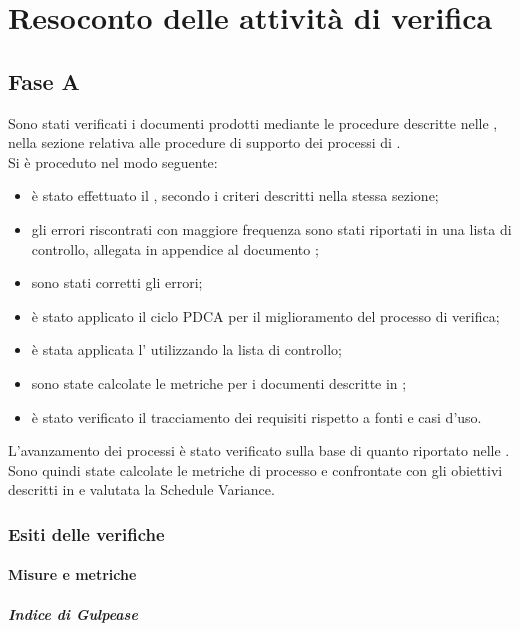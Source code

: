 \section{Resoconto delle attività di verifica}\label{app:resoconto_verifica}
\subsection{Fase A}
Sono stati verificati i documenti prodotti mediante le procedure descritte nelle \NormeDiProgetto{}, nella sezione relativa alle procedure di supporto dei processi di \VV{}.\\
Si è proceduto nel modo seguente:\begin{itemize}
	\item è stato effettuato il , secondo i criteri descritti nella stessa sezione;
	\item gli errori riscontrati con maggiore frequenza sono stati riportati in una lista di controllo, allegata in appendice al documento \NormeDiProgetto{};
	\item sono stati corretti gli errori;
	\item è stato applicato il ciclo PDCA per il miglioramento del processo di verifica;
	\item è stata applicata l' utilizzando la lista di controllo;
	\item sono state calcolate le metriche per i documenti descritte in \NormeDiProgetto{};
	\item è stato verificato il tracciamento dei requisiti rispetto a fonti e casi d'uso.
\end{itemize}
L'avanzamento dei processi è stato verificato sulla base di quanto riportato nelle \NormeDiProgetto{}. Sono quindi state calcolate le metriche di processo e confrontate con gli obiettivi descritti in  e valutata la Schedule Variance.

\subsubsection{Esiti delle verifiche}
\paragraph{Misure e metriche}\mbox{}
\subparagraph{Indice di Gulpease}\mbox{}\\
